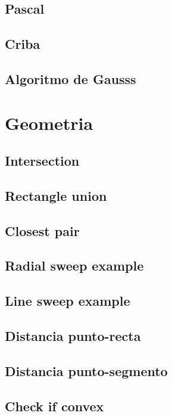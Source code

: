 \documentclass[oneside]{book}
\begin{document}
	\section{Pascal}
	
	\section{Criba}
	
	\section{Algoritmo de Gausss}
		
	\chapter{Geometria}
	\section{Intersection}
	
	\section{Rectangle union}
	
	\section{Closest pair}
	
	\section{Radial sweep example}
	
	\section{Line sweep example}
	
	\section{Distancia punto-recta}
	
	\section{Distancia punto-segmento}
	
	\section{Check if convex}
	
\end{document}
